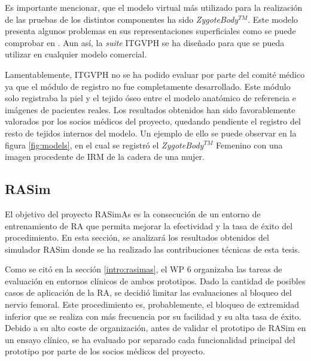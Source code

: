 Es importante mencionar, que el modelo virtual más utilizado para la realización de las pruebas de los distintos componentes ha sido \emph{ZygoteBody}$^{TM}$. Este modelo presenta algunos problemas en sus representaciones superficiales como se puede comprobar en \cite{zaitseva}. Aun así, la \emph{suite} \ac{ITGVPH} se ha diseñado para que se pueda utilizar en cualquier modelo comercial.%

Lamentablemente, \ac{ITGVPH} no se ha podido evaluar por parte del comité médico ya que el módulo de registro no fue completamente desarrollado. Este módulo solo registraba la piel y el tejido óseo entre el modelo anatómico de referencia e imágenes de pacientes reales. Los resultados obtenidos han sido favorablemente valorados por los socios médicos del proyecto, quedando pendiente el registro del resto de tejidos internos del modelo. Un ejemplo de ello se puede observar en la figura \ref{fig:models}, en el cual se registró el \emph{ZygoteBody}$^{TM}$ Femenino con una imagen procedente de \ac{IRM} de la cadera de una mujer. 







\subsection{RASim}
\label{result:rasim}


El objetivo del proyecto \ac{RASimAs} es la consecución de un entorno de entrenamiento de \ac{RA} que permita mejorar la efectividad y la tasa de éxito del procedimiento.  En esta sección, se analizará los resultados obtenidos del simulador \ac{RASim} donde se ha realizado las contribuciones técnicas de esta tesis.


Como se citó en la sección \ref{intro:rasimas}, el \acs{WP} 6 organizaba las tareas de evaluación en entornos clínicos de ambos prototipos. Dado la cantidad de posibles casos de aplicación de la \ac{RA}, se decidió limitar las evaluaciones al bloqueo del nervio femoral. Este procedimiento es, probablemente, el bloqueo de extremidad inferior que se realiza con más frecuencia por su facilidad y su alta tasa de éxito. Debido a su alto coste de organización, antes de validar el prototipo de \ac{RASim} en un ensayo clínico, se ha evaluado por separado cada funcionalidad principal del prototipo por parte de los socios médicos del proyecto.

